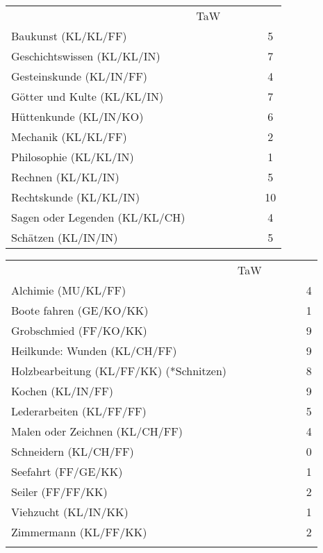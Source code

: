\documentclass{article}
\begin{document}
  \begin{table}[ht]
    \centering
    \begin{tabularx}{0.8\linewidth}{|Xclcc|c|}
      \hline
      \rowcolor{gray} \multicolumn{5}{|l|}{Wissen (B)} & TaW\\
      \rowcolor{white} Baukunst (KL/KL/FF) &&&&&5\\
      \rowcolor{white} Geschichtswissen (KL/KL/IN) &&&&&7\\
      \rowcolor{white} Gesteinskunde (KL/IN/FF) &&&&&4\\
      \rowcolor{white} Götter und Kulte (KL/KL/IN) &&&&&7\\
      \rowcolor{white} Hüttenkunde (KL/IN/KO) &&&&&6\\
      \rowcolor{white} Mechanik (KL/KL/FF) &&&&&2\\
      \rowcolor{white} Philosophie (KL/KL/IN) &&&&&1\\
      \rowcolor{white} Rechnen (KL/KL/IN) &&&&&5\\
      \rowcolor{white} Rechtskunde (KL/KL/IN) &&&&&10\\
      \rowcolor{white} Sagen oder Legenden (KL/KL/CH) &&&&&4\\
      \rowcolor{white} Schätzen (KL/IN/IN) &&&&&5\\
      \hline
    \end{tabularx}
    \centering
    \begin{tabularx}{0.8\linewidth}{|Xclcc|c|}
      \hline
      \rowcolor{gray} \multicolumn{5}{|l|}{Handwerk (B)} & TaW\\
      \rowcolor{white} Alchimie (MU/KL/FF) &&&&&4\\
      \rowcolor{white} Boote fahren (GE/KO/KK) &&&&&1\\
      \rowcolor{white} Grobschmied (FF/KO/KK) &&&&&9\\
      \rowcolor{white} Heilkunde: Wunden (KL/CH/FF) &&&&&9\\
      \rowcolor{white} Holzbearbeitung  (KL/FF/KK) (*Schnitzen) &&&&&8\\
      \rowcolor{white} Kochen (KL/IN/FF) &&&&&9\\
      \rowcolor{white} Lederarbeiten (KL/FF/FF) &&&&&5\\
      \rowcolor{white} Malen oder Zeichnen (KL/CH/FF) &&&&&4\\
      \rowcolor{white} Schneidern (KL/CH/FF) &&&&&0\\
      \rowcolor{white} Seefahrt (FF/GE/KK) &&&&&1\\
      \rowcolor{white} Seiler (FF/FF/KK) &&&&&2\\
      \rowcolor{white} Viehzucht (KL/IN/KK) &&&&&1\\
      \rowcolor{white} Zimmermann (KL/FF/KK) &&&&&2\\
      \rowcolor{white} 
      \hline
    \end{tabularx}
  \end{table}
\end{document}
